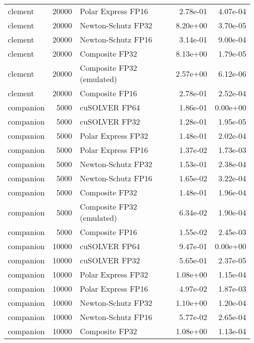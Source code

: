 \begin{table}
\begin{tabular}{lrlrr}
  clement & 20000 &        Polar Express FP16 &  2.78e-01 &        4.07e-04 \\
  clement & 20000 &        Newton-Schutz FP32 &  8.20e+00 &        3.70e-05 \\
  clement & 20000 &        Newton-Schutz FP16 &  3.14e-01 &        9.00e-04 \\
  clement & 20000 &            Composite FP32 &  8.13e+00 &        1.79e-05 \\
  clement & 20000 & Composite FP32 (emulated) &  2.57e+00 &        6.12e-06 \\
  clement & 20000 &            Composite FP16 &  2.78e-01 &        2.52e-04 \\
companion &  5000 &             cuSOLVER FP64 &  1.86e-01 &        0.00e+00 \\
companion &  5000 &             cuSOLVER FP32 &  1.28e-01 &        1.95e-05 \\
companion &  5000 &        Polar Express FP32 &  1.48e-01 &        2.02e-04 \\
companion &  5000 &        Polar Express FP16 &  1.37e-02 &        1.73e-03 \\
companion &  5000 &        Newton-Schutz FP32 &  1.53e-01 &        2.38e-04 \\
companion &  5000 &        Newton-Schutz FP16 &  1.65e-02 &        3.22e-04 \\
companion &  5000 &            Composite FP32 &  1.48e-01 &        1.96e-04 \\
companion &  5000 & Composite FP32 (emulated) &  6.34e-02 &        1.90e-04 \\
companion &  5000 &            Composite FP16 &  1.55e-02 &        2.45e-03 \\
companion & 10000 &             cuSOLVER FP64 &  9.47e-01 &        0.00e+00 \\
companion & 10000 &             cuSOLVER FP32 &  5.65e-01 &        2.37e-05 \\
companion & 10000 &        Polar Express FP32 &  1.08e+00 &        1.15e-04 \\
companion & 10000 &        Polar Express FP16 &  4.97e-02 &        1.87e-03 \\
companion & 10000 &        Newton-Schutz FP32 &  1.10e+00 &        1.20e-04 \\
companion & 10000 &        Newton-Schutz FP16 &  5.77e-02 &        2.65e-04 \\
companion & 10000 &            Composite FP32 &  1.08e+00 &        1.13e-04 \\

\end{tabular}
\end{table}
